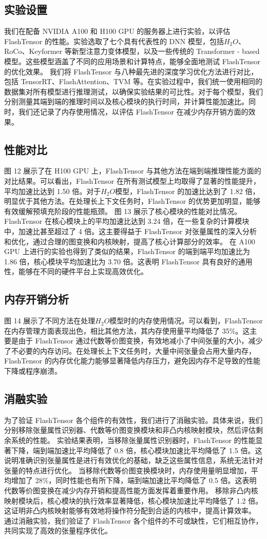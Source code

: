 \subsection{实验设置}
我们在配备 NVIDIA A100 和 H100 GPU 的服务器上进行实验，以评估 FlashTensor 的性能。实验选取了七个具有代表性的 DNN 模型，包括\(H_{2}O\)、RoCo、Keyformer 等新型注意力变体模型，以及一些传统的 Transformer - based 模型。这些模型涵盖了不同的应用场景和计算特点，能够全面地测试 FlashTensor 的优化效果。
我们将 FlashTensor 与八种最先进的深度学习优化方法进行对比，包括 TensorRT、FlashAttention、TVM 等。在实验过程中，我们统一使用相同的数据集对所有模型进行推理测试，以确保实验结果的可比性。对于每个模型，我们分别测量其端到端的推理时间以及核心模块的执行时间，并计算性能加速比。同时，我们还记录了内存使用情况，以评估 FlashTensor 在减少内存开销方面的效果。
\subsection{性能对比}
图 12 展示了在 H100 GPU 上，FlashTensor 与其他方法在端到端推理性能方面的对比结果。可以看出，FlashTensor 在所有测试模型上均取得了显著的性能提升，平均加速比达到 1.50 倍。对于\(H_{2}O\)模型，FlashTensor 的加速比达到了 1.82 倍，明显优于其他方法。在处理长上下文任务时，FlashTensor 的优势更加明显，能够有效缓解预填充阶段的性能瓶颈。
图 13 展示了核心模块的性能对比情况。FlashTensor 在核心模块上的平均加速比达到 3.24 倍，在一些复杂的计算模块中，加速比甚至超过了 4 倍。这主要得益于 FlashTensor 对张量属性的深入分析和优化，通过合理的图变换和内核映射，提高了核心计算部分的效率。
在 A100 GPU 上进行的实验也得到了类似的结果，FlashTensor 的端到端平均加速比为 1.86 倍，核心模块平均加速比为 3.70 倍。这表明 FlashTensor 具有良好的通用性，能够在不同的硬件平台上实现高效优化。
\subsection{内存开销分析}
图 14 展示了不同方法在处理\(H_{2}O\)模型时的内存使用情况。可以看到，FlashTensor 在内存管理方面表现出色，相比其他方法，其内存使用量平均降低了 35\%。这主要是由于 FlashTensor 通过代数等价图变换，有效地减小了中间张量的大小，减少了不必要的内存访问。在处理长上下文任务时，大量中间张量会占用大量内存，FlashTensor 的内存优化能力能够显著降低内存压力，避免因内存不足导致的性能下降或程序崩溃。
\subsection{消融实验}
为了验证 FlashTensor 各个组件的有效性，我们进行了消融实验。具体来说，我们分别移除张量属性识别器、代数等价图变换模块和非凸内核映射模块，然后评估剩余系统的性能。
实验结果表明，当移除张量属性识别器时，FlashTensor 的性能显著下降，端到端加速比平均降低了 0.8 倍，核心模块加速比平均降低了 1.5 倍。这说明准确识别张量属性是进行有效优化的基础，缺乏这些属性信息，系统无法针对张量的特点进行优化。
当移除代数等价图变换模块时，内存使用量明显增加，平均增加了 28\%，同时性能也有所下降，端到端加速比平均降低了 0.5 倍。这表明代数等价图变换在减少内存开销和提高性能方面发挥着重要作用。
移除非凸内核映射模块后，核心模块的执行效率显著降低，核心模块加速比平均降低了 1.2 倍。这证明非凸内核映射能够有效地将操作符分配到合适的内核中，提高计算效率。
通过消融实验，我们验证了 FlashTensor 各个组件的不可或缺性，它们相互协作，共同实现了高效的张量程序优化。
